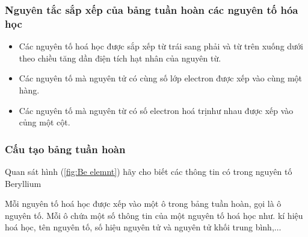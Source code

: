 \subsubsection{Nguyên tắc sắp xếp của bảng tuần hoàn các nguyên tố hóa học}
\begin{tomtat}
	\begin{itemize}
		\item  Các nguyên tố hoá học được sắp xếp từ trái sang phải và từ trên xuống dưới theo chiều tăng dần điện tích hạt nhân của nguyên từ.
		\item  Các nguyên tố mà nguyên tử có cùng số lớp electron được xếp vào cùng một hàng.
		\item  Các nguyên tố mà nguyên từ có số electron hoá trị\footnotemark[1]  như nhau được xếp vào củng một cột.
	\end{itemize}
\end{tomtat}
\subsubsection{Cấu tạo bảng tuần hoàn}
\begin{paracol}{2}
	\switchcolumn
	\begin{hoivadap}
		\begin{cauhoi}
			Quan sát hình (\ref{fig:Be elemnt}) hãy cho biết các thông tin có trong nguyên tố Beryllium
		\end{cauhoi}
	\end{hoivadap}
\end{paracol}
\begin{ghinho}
	 Mỗi nguyên tố hoá học được xếp vào một ô trong bảng tuần hoàn, gọi là ô nguyên tố. Mỗi ô chứa một số thông tin của một nguyên tố hoá học như. kí hiệu hoá học, tên nguyên tố, số hiệu nguyên tử và nguyên tử khối trung bình,$\ldots$
	\begin{center}
	\end{center}
\end{ghinho}

